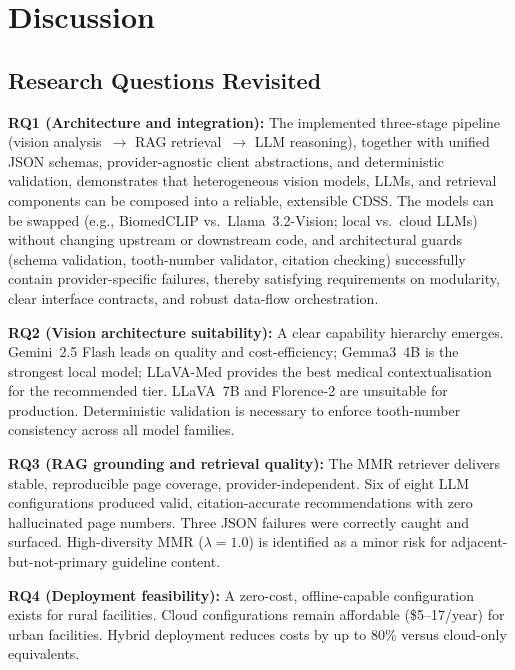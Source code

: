 \documentclass[12pt,a4paper]{report}
\begin{document}
	\section{Discussion}
	\label{sec:results_discussion}
	
	\subsection{Research Questions Revisited}
	
	\textbf{RQ1 (Architecture and integration):} The implemented three-stage pipeline (vision analysis~$\rightarrow$ RAG retrieval~$\rightarrow$ LLM reasoning), together with unified JSON schemas, provider-agnostic client abstractions, and deterministic validation, demonstrates that heterogeneous vision models, LLMs, and retrieval components can be composed into a reliable, extensible CDSS. The models can be swapped (e.g., BiomedCLIP vs.\ Llama~3.2-Vision; local vs.\ cloud LLMs) without changing upstream or downstream code, and architectural guards (schema validation, tooth-number validator, citation checking) successfully contain provider-specific failures, thereby satisfying requirements on modularity, clear interface contracts, and robust data-flow orchestration.
	
	\textbf{RQ2 (Vision architecture suitability):} A clear capability hierarchy
	emerges. Gemini~2.5 Flash leads on quality and cost-efficiency; Gemma3~4B is
	the strongest local model; LLaVA-Med provides the best medical contextualisation
	for the recommended tier. LLaVA~7B and Florence-2 are unsuitable for production.
	Deterministic validation is necessary to enforce tooth-number consistency across
	all model families.
	
	\textbf{RQ3 (RAG grounding and retrieval quality):} The MMR retriever delivers
	stable, reproducible page coverage, provider-independent. Six of eight LLM
	configurations produced valid, citation-accurate recommendations with zero
	hallucinated page numbers. Three JSON failures were correctly caught and surfaced.
	High-diversity MMR ($\lambda{=}1.0$) is identified as a minor risk for
	adjacent-but-not-primary guideline content.
	
	\textbf{RQ4 (Deployment feasibility):} A zero-cost, offline-capable
	configuration exists for rural facilities. Cloud configurations remain affordable
	(\$5--17/year) for urban facilities. Hybrid deployment reduces costs by up to
	80\% versus cloud-only equivalents.
	
\end{document}
